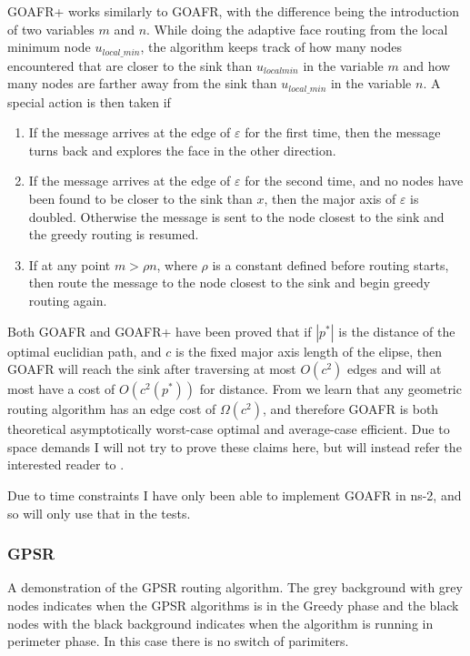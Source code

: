 GOAFR+ works similarly to GOAFR, with the difference being the introduction of two variables $m$ and $n$. While doing the adaptive face routing from the local minimum node $u_{local\_ min}$, the algorithm keeps track of how many nodes encountered that are closer to the sink than $u_{local min}$ in the variable $m$ and how many nodes are farther away from the sink than $u_{local\_min}$ in the variable $n$.
A special action is then taken if
\begin{enumerate}
\item If the message arrives at the edge of $\varepsilon$ for the first time, then the message turns back and explores the face in the other direction. 
\item If the message arrives at the edge of $\varepsilon$ for the second time, and no nodes have been found to be closer to the sink than $x$, then the major axis of $\varepsilon$ is doubled. Otherwise the message is sent to the node closest to the sink and the greedy routing is resumed.
\item If at any point $m > \rho n$, where $\rho$ is a constant defined before routing starts, then route the message to the node closest to the sink and begin greedy routing again.
\end{enumerate}

Both GOAFR and GOAFR+ have been proved that if $|p^*|$ is the distance of the optimal euclidian path, and $c$ is the fixed major axis length of the elipse, then GOAFR will reach the sink after traversing at most $O(c^2)$ edges and will at most have a cost of $O(c^2(p^*))$ for distance. From \cite{asymp} we learn that any geometric routing algorithm has an edge cost of  $\Omega(c^2)$, and therefore GOAFR is both theoretical asymptotically worst-case optimal and average-case efficient. Due to space demands I will not try to prove these claims here, but will instead refer the interested reader to \cite{gopher+, asymp, gopher}.

Due to time constraints I have only been able to implement GOAFR in ns-2, and so will only use that in the tests.

\subsubsection{GPSR}
{A demonstration of the GPSR routing algorithm. The grey background with grey nodes indicates when the GPSR algorithms is in the Greedy phase and the black nodes with the black background indicates when the algorithm is running in perimeter phase. In this case there is no switch of parimiters.}

